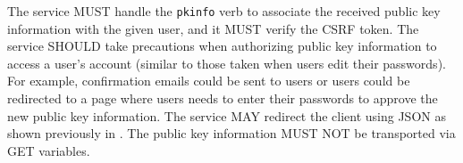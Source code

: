 \documentclass{article}
\newcommand{\todo}[1]{\textcolor{red}{#1}}
\begin{document}
The service MUST handle the \texttt{pkinfo} verb to associate the received public key information with the given user, and it MUST verify the CSRF token. 
The service SHOULD take precautions when authorizing public key information to access a user's account (similar to those taken when users edit their passwords). 
For example, confirmation emails could be sent to users or users could be redirected to a page where users needs to enter their passwords to approve the new public key information. 
The service MAY redirect the client using JSON as shown previously in . 
The public key information MUST NOT be transported via GET variables. 



\end{document}
